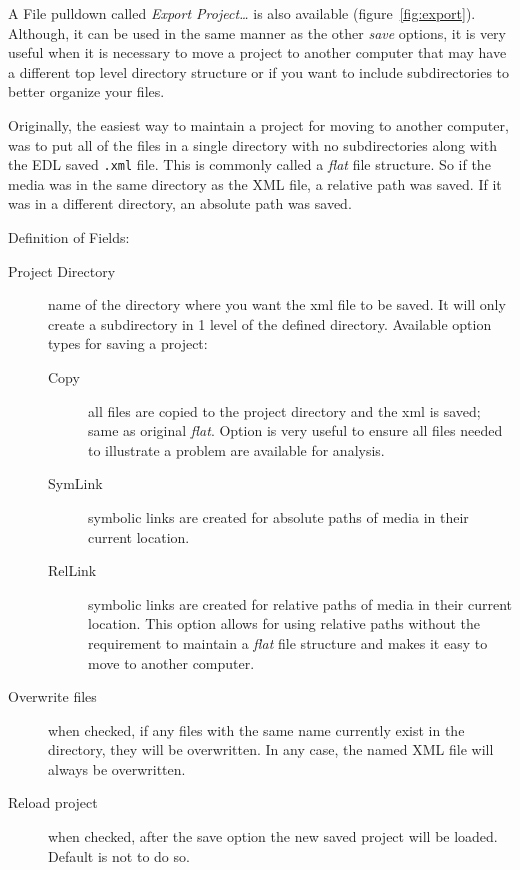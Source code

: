 A File pulldown called \textit{Export Project\dots} is also available (figure~\ref{fig:export}).  Although, it can be used in the same manner as the other \textit{save} options, it is very useful when it is necessary to move a project to another computer that may have a different top level directory structure or if you want to include subdirectories to better organize your files.  

Originally, the easiest way to maintain a project for moving to another computer, was to put all of the files in a single directory with no subdirectories along with the EDL saved \texttt{.xml} file.   This is commonly called a \textit{flat} file structure.  So if the media was in the same directory as the XML file, a relative path was saved.  If it was in a different directory, an absolute path was saved.

\noindent Definition of Fields:

\begin{description}
    \item[Project Directory] name of the directory where you want the xml file to be saved.  It will only create
    a subdirectory in 1 level of the defined directory.
    Available option types for saving a project:
    \begin{description}
        \item[Copy] all files are copied to the project directory and the xml is saved; same as original \textit{flat}.
        Option is very useful to ensure all files needed to illustrate a problem are available for analysis.
        \item[SymLink] symbolic links are created for absolute paths of media in their current location.
        \item[RelLink] symbolic links are created for relative paths of media in their current location.  This
        option allows for using relative paths without the requirement to maintain a \textit{flat} file structure
        and makes it easy to move to another computer.
    \end{description}
    \item[Overwrite files] when checked, if any files with the same name currently exist in the directory, they
    will be overwritten.  In any case, the named XML file will always be overwritten.
    \item[Reload project] when checked, after the save option the new saved project will be loaded. Default is not to do so.
\end{description}

